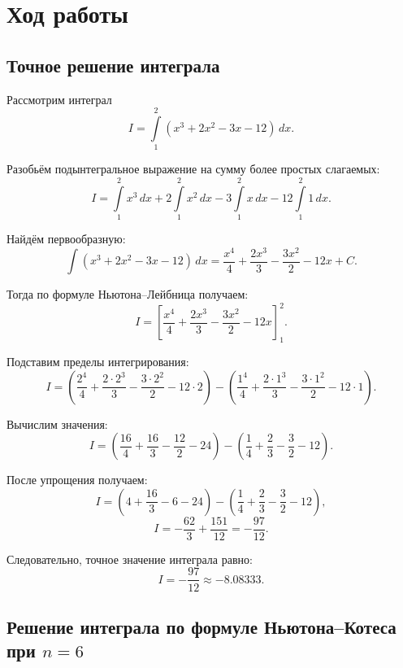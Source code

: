 \documentclass[12pt]{report}
\begin{document}
	\section*{Ход работы}
	
	\subsection*{Точное решение интеграла}
	
	\begin{flushleft}
		Рассмотрим интеграл
		\[
		I=\int\limits_{1}^{2}(x^3+2x^2-3x-12)\,dx.
		\]
		
		Разобьём подынтегральное выражение на сумму более простых слагаемых:
		\[
		I=\int\limits_{1}^{2}x^3\,dx+2\int\limits_{1}^{2}x^2\,dx-3\int\limits_{1}^{2}x\,dx-12\int\limits_{1}^{2}1\,dx.
		\]
		
		Найдём первообразную:
		\[
		\int (x^3+2x^2-3x-12)\,dx=\frac{x^4}{4}+\frac{2x^3}{3}-\frac{3x^2}{2}-12x+C.
		\]
		
		Тогда по формуле Ньютона--Лейбница получаем:
		\[
		I=\left[\frac{x^4}{4}+\frac{2x^3}{3}-\frac{3x^2}{2}-12x\right]_{1}^{2}.
		\]
		
		Подставим пределы интегрирования:
		\[
		I=\left(\frac{2^4}{4}+\frac{2\cdot2^3}{3}-\frac{3\cdot2^2}{2}-12\cdot2\right)
		-
		\left(\frac{1^4}{4}+\frac{2\cdot1^3}{3}-\frac{3\cdot1^2}{2}-12\cdot1\right).
		\]
		
		Вычислим значения:
		\[
		I=\left(\frac{16}{4}+\frac{16}{3}-\frac{12}{2}-24\right)
		-\left(\frac{1}{4}+\frac{2}{3}-\frac{3}{2}-12\right).
		\]
		
		После упрощения получаем:
		\[
		I=\left(4+\frac{16}{3}-6-24\right)-\left(\frac{1}{4}+\frac{2}{3}-\frac{3}{2}-12\right),
		\]
		\[
		I=-\frac{62}{3}+\frac{151}{12}=-\frac{97}{12}.
		\]
		
		Следовательно, точное значение интеграла равно:
		\[
		\boxed{I=-\frac{97}{12}\approx -8.08333.}
		\]
	\end{flushleft}
	
	\subsection*{Решение интеграла по формуле Ньютона--Котеса при $n=6$}
	
\end{document}
